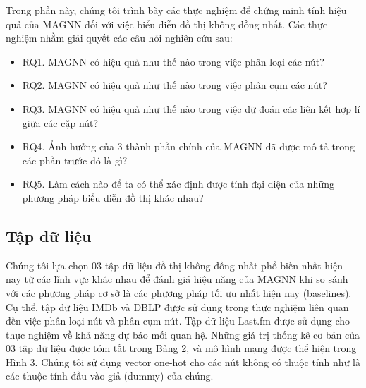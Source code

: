 Trong phần này, chúng tôi trình bày các thực nghiệm để chứng minh tính hiệu quả của MAGNN đối với việc biểu diễn đồ thị không đồng nhất. Các thực nghiệm nhằm giải quyết các câu hỏi nghiên cứu sau:

\begin{itemize}
  \item RQ1. MAGNN có hiệu quả như thế nào trong việc phân loại các nút?
  \item RQ2. MAGNN có hiệu quả như thế nào trong việc phân cụm các nút?
  \item RQ3. MAGNN có hiệu quả như thế nào trong việc dữ đoán các liên kết hợp lí giữa các cặp nút?
  \item RQ4. Ảnh hưởng của 3 thành phần chính của MAGNN đã được mô tả trong các phần trước đó là gì?
  \item RQ5. Làm cách nào để ta có thể xác định được tính đại diện của những phương pháp biểu diễn đồ thị khác nhau?
\end{itemize}

\subsection{Tập dữ liệu}
Chúng tôi lựa chọn 03 tập dữ liệu đồ thị không đồng nhất phổ biến nhất hiện nay từ các lĩnh vực khác nhau để đánh giá hiệu năng của MAGNN khi so sánh với các phương pháp cơ sở là các phương pháp tối ưu nhất hiện nay (baselines). Cụ thể, tập dữ liệu IMDb và DBLP được sử dụng trong thực nghiệm liên quan đến việc phân loại nút và phân cụm nút. Tập dữ liệu Last.fm được sử dụng cho thực nghiệm về khả năng dự báo mối quan hệ. Những giá trị thống kê cơ bản của 03 tập dữ liệu được tóm tắt trong Bảng 2, và mô hình mạng được thể hiện trong Hình 3. Chúng tôi sử dụng vector one-hot cho các nút không có thuộc tính như là các thuộc tính đầu vào giả (dummy) của chúng. 

